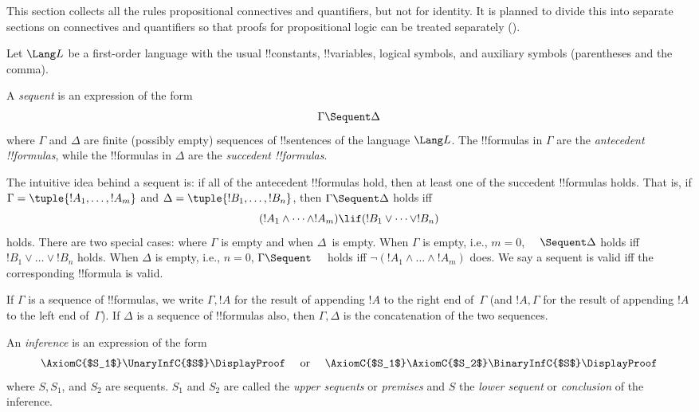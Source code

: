 \documentclass[../../../include/open-logic-section]{subfiles}
\begin{document}


\begin{editorial}
  This section collects all the rules propositional connectives and
  quantifiers, but not for identity.  It is planned to divide this
  into separate sections on connectives and quantifiers so that proofs
  for propositional logic can be treated separately
  ().
\end{editorial}

Let $\Lang L$ be a first-order language with the usual !!{constant}s,
!!{variable}s, logical symbols, and auxiliary symbols (parentheses
and the comma).

\begin{defn}[Sequent]
A \emph{sequent} is an expression of the form
\[ \Gamma \Sequent \Delta \]
where $\Gamma$ and $\Delta$ are finite (possibly empty) sequences of
!!{sentence}s of the language $\Lang L$. The !!{formula}s in $\Gamma$
are the \emph{antecedent !!{formula}s}, while the !!{formula}s in
$\Delta$ are the \emph{succedent !!{formula}s}.
\end{defn}

The intuitive idea behind a sequent is: if all of the antecedent
!!{formula}s hold, then at least one of the succedent !!{formula}s
holds. That is, if $\Gamma = \tuple{!A_1, \dots, !A_m}$ and
$\Delta = \tuple{!B_1, \dots, !B_n}$, then $\Gamma \Sequent
\Delta$ holds iff
\[
(!A_1 \land \cdots \land !A_m) \lif (!B_1 \lor \cdots \lor
!B_n)
\]
holds. There are two special cases: where $\Gamma$ is empty and when
$\Delta$~is empty. When $\Gamma$ is empty, i.e., $m = 0$, $\quad
\Sequent \Delta$ holds iff $!B_1 \lor \dots \lor !B_n$ holds. When
$\Delta$ is empty, i.e., $n = 0$, $\Gamma \Sequent \quad$ holds iff
$\lnot(!A_1 \land \dots \land !A_m)$ does.  We say a sequent is valid
iff the corresponding !!{formula} is valid.

If $\Gamma$ is a sequence of !!{formula}s, we write $\Gamma, !A$ for
the result of appending $!A$ to the right end of~$\Gamma$ (and $!A,
\Gamma$ for the result of appending $!A$ to the left end
of~$\Gamma$). If $\Delta$ is a sequence of !!{formula}s also, then $\Gamma,
\Delta$ is the concatenation of the two sequences.

\begin{defn}[Inference]
An \emph{inference} is an expression of the form
\[
\AxiomC{$S_1$}
\UnaryInfC{$S$}
\DisplayProof
\quad
\textrm{  or  }
\quad
\AxiomC{$S_1$}
\AxiomC{$S_2$}
\BinaryInfC{$S$}
\DisplayProof
\]
where $S, S_1$, and $S_2$ are sequents. $S_1$ and $S_2$ are called the
\emph{upper sequents} or \emph{premises} and $S$ the \emph{lower
  sequent} or \emph{conclusion} of the inference.
\end{defn}
\end{document}
